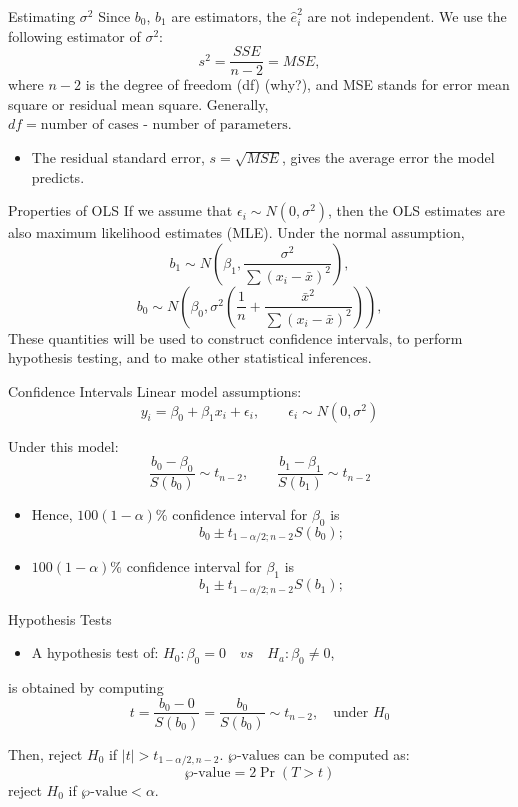 \documentclass[
  ignorenonframetext,
]{beamer}
\providecommand{\tightlist}{%
  \setlength{\itemsep}{0pt}\setlength{\parskip}{0pt}}
\begin{document}
\begin{frame}{Estimating \(\sigma^2\)}
\protect\hypertarget{estimating-sigma2-1}{}
Since \(b_0\), \(b_1\) are estimators, the \(\hat{e}_i^2\) are not
independent. We use the following estimator of \(\sigma^2\):
\[ s^2=\frac{SSE}{n-2}=MSE,\] where \(n-2\) is the degree of freedom
(df) (why?), and MSE stands for error mean square or residual mean
square. Generally, \(df=\text{number of cases - number of parameters}\).

\begin{itemize}
\tightlist
\item
  The residual standard error, \(s=\sqrt{MSE}\), gives the average error
  the model predicts.
\end{itemize}
\end{frame}

\begin{frame}{Properties of OLS}
\protect\hypertarget{properties-of-ols}{}
If we assume that \(\epsilon_i \sim N(0, \sigma^2)\), then the OLS
estimates are also maximum likelihood estimates (MLE). Under the normal
assumption,
\[b_1\sim N\left(\beta_1 , \frac{\sigma^2}{\sum(x_i-\bar{x})^2}\right),\]
\[b_0\sim N\left(\beta_0 , \sigma^2\left(\frac{1}{n}+\frac{\bar{x}^2}{\sum(x_i-\bar{x})^2}\right)\right),\]
These quantities will be used to construct confidence intervals, to
perform hypothesis testing, and to make other statistical inferences.
\end{frame}

\begin{frame}{Confidence Intervals}
\protect\hypertarget{confidence-intervals}{}
Linear model assumptions:
\[y_i=\beta_0+\beta_1 x_i+\epsilon_i, \quad \quad \epsilon_i \sim N(0, \sigma^2)\]

Under this model:
\[\frac{b_0-\beta_0}{S(b_0)}\sim t_{n-2}, \quad \quad \frac{b_1-\beta_1}{S(b_1)}\sim t_{n-2}\]

\begin{itemize}
\tightlist
\item
  Hence, \(100(1-\alpha)\%\) confidence interval for \(\beta_0\) is
  \[b_0\pm t_{1 -\alpha/2; n- 2}S(b_0);\]
\item
  \(100(1-\alpha)\%\) confidence interval for \(\beta_1\) is
  \[b_1\pm t_{1 - \alpha/2; n - 2}S(b_1);\]
\end{itemize}
\end{frame}

\begin{frame}{Hypothesis Tests}
\protect\hypertarget{hypothesis-tests}{}
\begin{itemize}
\tightlist
\item
  A hypothesis test of:
  \(H_0: \beta_0=0\quad vs \quad H_a: \beta_0\neq 0\),
\end{itemize}

is obtained by computing
\[ t=\frac{b_0-0}{S(b_0)}=\frac{b_0}{S(b_0)}\sim t_{n-2}, \quad \text{under } H_0\]

Then, reject \(H_0\) if \(|t|>t_{1-\alpha/2, n-2}\).
\(\wp\text{-value}\)s can be computed as: \[\wp\text{-value}=2\Pr(T>t)\]
reject \(H_0\) if \(\wp\text{-value}<\alpha\).
\end{frame}
\end{document}
